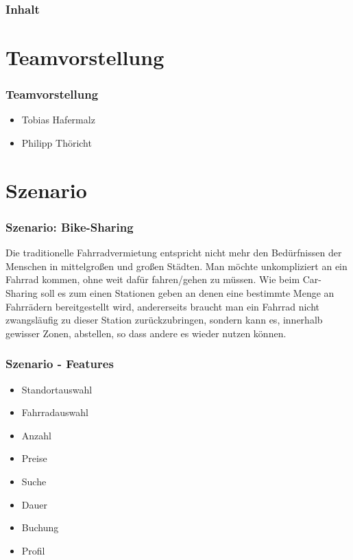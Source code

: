 \begin{frame}
	\frametitle*{Inhalt}
	\tableofcontents
\end{frame}

\section{Teamvorstellung}
\begin{frame}
	\frametitle*{Teamvorstellung}
	\begin{itemize}
		\item Tobias Hafermalz
		\item Philipp Thöricht
	\end{itemize}
\end{frame}

\section{Szenario}
\begin{frame}
	\frametitle*{Szenario: Bike-Sharing} 
	Die traditionelle Fahrradvermietung entspricht nicht mehr den Bedürfnissen der Menschen in mittelgroßen und großen Städten.
	Man möchte unkompliziert an ein Fahrrad kommen, ohne weit dafür fahren/gehen zu müssen.
	Wie beim Car-Sharing soll es zum einen Stationen geben an denen eine bestimmte Menge an Fahrrädern bereitgestellt wird, andererseits braucht man ein Fahrrad nicht zwangsläufig zu dieser Station zurückzubringen, sondern kann es, innerhalb gewisser Zonen, abstellen, so dass andere es wieder nutzen können.
\end{frame}

\begin{frame}
	\frametitle*{Szenario - Features}
	\begin{itemize}
		\item Standortauswahl
		\item Fahrradauswahl 
		\item Anzahl
		\item Preise
		\item Suche
		\item Dauer
		\item Buchung
		\item Profil
	\end{itemize}
\end{frame}

